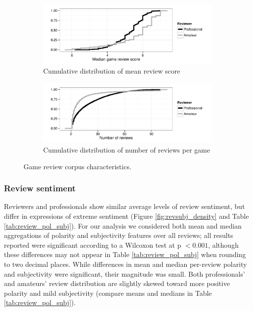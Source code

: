 \documentclass[letterpaper]{article}
\begin{document}
\begin{figure}[tb]
\centering


\begin{subfigure}[b]{\linewidth}
\includegraphics[width=\linewidth]{./console_games_scoremedian_ecdf}
\caption{Cumulative distribution of mean review score}
\label{fig:game_score}
\end{subfigure}
\begin{subfigure}[b]{\linewidth}
\includegraphics[width=\linewidth]{./console_games_numreviews_ecdf}
\caption{Cumulative distribution of number of reviews per game}
\label{fig:game_reviewnum}
\end{subfigure}
\caption{Game review corpus characteristics.}
\label{fig:revscore_console}
\end{figure}

\subsubsection{Review sentiment}
Reviewers and professionals show similar average levels of review sentiment, but differ in expressions of extreme sentiment (Figure \ref{fig:revsubj_density} and Table \ref{tab:review_pol_subj}).
For our analysis we considered both mean and median aggregations of polarity and subjectivity features over all reviews; all results reported were significant according to a Wilcoxon test at p $< 0.001$, although these differences may not appear in Table \ref{tab:review_pol_subj} when rounding to two decimal places. While differences in mean and median per-review polarity and subjectivity were significant, their magnitude was small.
Both professionals' and amateurs' review distribution are slightly skewed toward more positive polarity and mild subjectivity (compare means and medians in Table \ref{tab:review_pol_subj}). 
\end{document}

